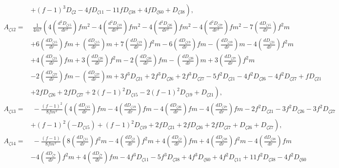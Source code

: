 \documentclass[10pt,twocolumn,preprintnumbers,amsmath,amssymb,nofootinbib
,superscriptaddress]{revtex4-1}
\begin{document}
{{{\begin{widetext}
\begin{align}
 &\left.+(f-1)^3 D_{\zeta2}-4 f
 D_{\zeta11}-11 f D_{\zeta38}+4 f
 D_{\zeta60}+D_{\zeta38}\right), \nonumber\\
 A_{\zeta12}=&\;\frac{1}{4 m^2}\left(4 \left(\frac{d^2D_{\zeta15}}{dr^2}\right) f m^2-4 \left(\frac{d^2D_{\zeta19}}{dr^2}\right) f m^2-4 \left(\frac{d^2D_{\zeta26}}{dr^2}\right) f m^2-4 \left(\frac{d^2D_{\zeta27}}{dr^2}\right) f
 m^2-7 \left(\frac{dD_{\zeta15}}{dr}\right) f^2 m\right.\nonumber\\
 &\left.+6 \left(\frac{dD_{\zeta15}}{dr}\right) f m+\left(\frac{dD_{\zeta15}}{dr}\right) m+7 \left(\frac{dD_{\zeta19}}{dr}\right) f^2 m-6
 \left(\frac{dD_{\zeta19}}{dr}\right) f m-\left(\frac{dD_{\zeta19}}{dr}\right) m-4 \left(\frac{dD_{\zeta21}}{dr}\right) f^2 m\right.\nonumber\\
 &\left.+4 \left(\frac{dD_{\zeta21}}{dr}\right) f m+3 \left(\frac{dD_{\zeta26}}{dr}\right)
 f^2 m-2 \left(\frac{dD_{\zeta26}}{dr}\right) f m-\left(\frac{dD_{\zeta26}}{dr}\right) m+3 \left(\frac{dD_{\zeta27}}{dr}\right) f^2 m\right.\nonumber\\
 &\left.-2 \left(\frac{dD_{\zeta27}}{dr}\right) f
 m-\left(\frac{dD_{\zeta27}}{dr}\right) m+3 f^3 D_{\zeta21}+2 f^3 D_{\zeta26}+2 f^3
 D_{\zeta27}-5 f^2 D_{\zeta21}-4 f^2
 D_{\zeta26}-4 f^2 D_{\zeta27}+f D_{\zeta21}\right.\nonumber\\
 &\left.+2 f
 D_{\zeta26}+2 f D_{\zeta27}+2 (f-1)^2
 D_{\zeta15}-2 (f-1)^2
 D_{\zeta19}+D_{\zeta21}\right),\nonumber\\
 A_{\zeta13}=&\;-\frac{(f-1)^2}{8 f
 m^2} \left(4 \left(\frac{dD_{\zeta15}}{dr}\right) f m-4 \left(\frac{dD_{\zeta19}}{dr}\right) f m-4 \left(\frac{dD_{\zeta26}}{dr}\right) f m-4
 \left(\frac{dD_{\zeta27}}{dr}\right) f m-2 f^2 D_{\zeta21}-3 f^2 D_{\zeta26}-3 f^2
 D_{\zeta27}\right.\nonumber\\
 &\left.+(f-1)^2 (-D_{\zeta15})+(f-1)^2
 D_{\zeta19}+2 f D_{\zeta21}+2 f D_{\zeta26}+2 f
 D_{\zeta27}+D_{\zeta26}+D_{\zeta27}\right),\nonumber\\
 A_{\zeta14}=&\;-\frac{(f-1)}{8 f m^2} \left(8 \left(\frac{dD_{\zeta11}}{dr}\right) f^2 m-4 \left(\frac{dD_{\zeta2}}{dr}\right) f^2 m+4 \left(\frac{dD_{\zeta2}}{dr}\right) f m+4
 \left(\frac{dD_{\zeta38}}{dr}\right) f^2 m-4 \left(\frac{dD_{\zeta38}}{dr}\right) f m\right.\nonumber\\
 &\left.-4 \left(\frac{dD_{\zeta7}}{dr}\right) f^2 m+4 \left(\frac{dD_{\zeta7}}{dr}\right) f m-4 f^3
 D_{\zeta11}-5 f^3 D_{\zeta38}+4 f^3
 D_{\zeta60}+4 f^2 D_{\zeta11}+11 f^2
 D_{\zeta38}-4 f^2 D_{\zeta60}\right.\nonumber\\

\end{align}
\end{widetext}}}}
\end{document}
